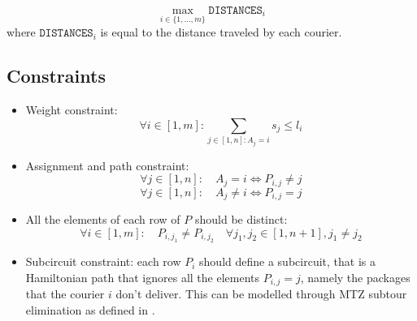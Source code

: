 \[ \max_{i \in \{1, \dots, m\}} \texttt{DISTANCES}_i  \]
where $\texttt{DISTANCES}_i$ is equal to the distance traveled by each courier.

\subsection{Constraints}

\begin{itemize}
    \item Weight constraint: 
    \begin{equation}
        \forall i \in [1, m]: \sum_{j \in [1, n]: A_j = i} s_j \leq l_i 
    \end{equation}

    \item Assignment and path constraint:
    \begin{equation}
        \forall j \in [1, n]: \quad A_j = i \Longleftrightarrow P_{i,j} \neq j
    \end{equation}
    \begin{equation}
        \forall j \in [1, n]: \quad A_j \neq i \Longleftrightarrow P_{i,j} = j
    \end{equation}

    \item All the elements of each row of $P$ should be distinct:
    \begin{equation}
        \forall i \in [1, m]: \quad P_{i,j_1} \neq P_{i,j_2} \quad \forall j_1,j_2 \in [1, n+1], j_1 \neq j_2 
    \end{equation}



    \item Subcircuit constraint: each row $P_i$ should define a subcircuit, that is a Hamiltonian path that ignores all the elements $P_{i,j} = j$, namely the packages that the courier $i$ don't deliver. This can be modelled through MTZ subtour elimination as defined in .

\end{itemize}


